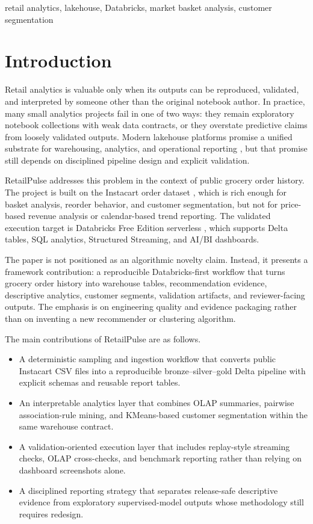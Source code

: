 \documentclass[journal]{IEEEtran}
\begin{document}
\begin{IEEEkeywords}
retail analytics, lakehouse, Databricks, market basket analysis, customer segmentation
\end{IEEEkeywords}

\section{Introduction}
Retail analytics is valuable only when its outputs can be reproduced, validated, and interpreted by someone other than the original notebook author. In practice, many small analytics projects fail in one of two ways: they remain exploratory notebook collections with weak data contracts, or they overstate predictive claims from loosely validated outputs. Modern lakehouse platforms promise a unified substrate for warehousing, analytics, and operational reporting \cite{armbrust2020deltalake,zaharia2021lakehouse}, but that promise still depends on disciplined pipeline design and explicit validation.

RetailPulse addresses this problem in the context of public grocery order history. The project is built on the Instacart order dataset \cite{instacart_dataset}, which is rich enough for basket analysis, reorder behavior, and customer segmentation, but not for price-based revenue analysis or calendar-based trend reporting. The validated execution target is Databricks Free Edition serverless \cite{databricks_free}, which supports Delta tables, SQL analytics, Structured Streaming, and AI/BI dashboards.

The paper is not positioned as an algorithmic novelty claim. Instead, it presents a framework contribution: a reproducible Databricks-first workflow that turns grocery order history into warehouse tables, recommendation evidence, descriptive analytics, customer segments, validation artifacts, and reviewer-facing outputs. The emphasis is on engineering quality and evidence packaging rather than on inventing a new recommender or clustering algorithm.

The main contributions of RetailPulse are as follows.
\begin{itemize}
    \item A deterministic sampling and ingestion workflow that converts public Instacart CSV files into a reproducible bronze--silver--gold Delta pipeline with explicit schemas and reusable report tables.
    \item An interpretable analytics layer that combines OLAP summaries, pairwise association-rule mining, and KMeans-based customer segmentation within the same warehouse contract.
    \item A validation-oriented execution layer that includes replay-style streaming checks, OLAP cross-checks, and benchmark reporting rather than relying on dashboard screenshots alone.
    \item A disciplined reporting strategy that separates release-safe descriptive evidence from exploratory supervised-model outputs whose methodology still requires redesign.
\end{itemize}
\end{document}
